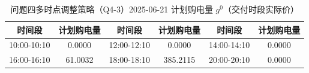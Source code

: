 \begin{table}[htbp]
\centering
\caption{问题四多时点调整策略（Q4-3）2025-06-21 计划购电量 $g^0$（交付时段实际价）}\label{tab:q4-3-purchase}
\normalsize\setlength{\tabcolsep}{5pt}
\begin{tabular}{@{}cccccc@{}}
\toprule
时间段 & 计划购电量 & 时间段 & 计划购电量 & 时间段 & 计划购电量 \\
\midrule
10:00-10:10 & 0.0000 & 12:00-12:10 & 0.0000 & 14:00-14:10 & 0.0000 \\
16:00-16:10 & 61.0032 & 18:00-18:10 & 385.2115 & 20:00-20:10 & 0.0000 \\
\bottomrule
\end{tabular}
\end{table}
